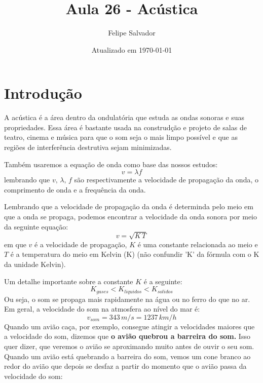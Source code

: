 \documentclass[12pt]{extarticle}
\title{Aula 26 - Acústica}
\author{Felipe Salvador}
\date{Atualizado em \today}
\newcommand{\<}{\langle}
\renewcommand{\>}{\rangle}
\theoremstyle{definition}
\begin{document}
\maketitle

\section{Introdução}
A acústica é a área dentro da ondulatória que estuda as ondas sonoras e suas propriedades. Essa área é bastante usada na construdção e projeto de salas de teatro, cinema e música para que o som seja o mais limpo possível e que as regiões de interferência destrutiva sejam minimizadas.

Também usaremos a equação de onda como base das nossos estudos:
\begin{equation}
    v=\lambda f
\end{equation}
\noindent lembrando que $v,\,\lambda,\,f$ são respectivamente a velocidade de propagação da onda, o comprimento de onda e a frequência da onda.

Lembrando que a velocidade de propagação da onda é determinda pelo meio em que a onda se propaga, podemos encontrar a velocidade da onda sonora por meio da seguinte equação:
\begin{equation}
    v=\sqrt{K\,T}
\end{equation}
\noindent em que $v$ é a velocidade de propagação, $K$ é uma constante relacionada ao meio e $T$ é a temperatura do meio em Kelvin (K) (não confundir 'K' da fórmula com o K da unidade Kelvin).

Um detalhe importante sobre a constante $K$ é a seguinte:
\begin{equation}
    K_{gases} < K_{liquidos} < K_{solidos}
\end{equation}
Ou seja, o som se propaga mais rapidamente na água ou no ferro do que no ar. Em geral, a velocidade do som na atmosfera ao nível do mar é:
\begin{equation}
    v_{som} = 343\,m/s = 1237\,km/h
\end{equation}
Quando um avião caça, por exemplo, consegue atingir a velocidades maiores que a velocidade do som, dizemos que \textbf{o avião quebrou a barreira do som.} Isso quer dizer, que veremos o avião se aproximando muito antes de ouvir o seu som. Quando um avião está quebrando a barreira do som, vemos um cone branco ao redor do avião que depois se desfaz a partir do momento que o avião passa da velocidade do som:
\end{document}
